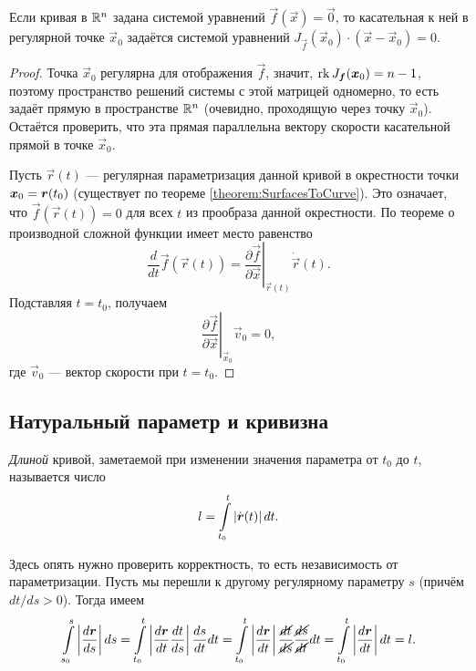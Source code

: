 \begin{proposition}
	Если кривая в $\mathbb{R}^n$ задана системой уравнений $\vec{f}(\vec{x}) = \vec{0}$, то касательная к ней в регулярной точке $\vec{x}_0$ задаётся системой уравнений $J_{\vec{f}}(\vec{x}_0) \cdot (\vec{x} - \vec{x}_0) = 0$.
\end{proposition}

\begin{proof}
	Точка $\vec{x}_0$ регулярна для отображения $\vec{f}$, значит, $\operatorname{rk} J_{\boldsymbol{f}}(\boldsymbol{x}_0) = n - 1$, поэтому пространство решений системы с этой матрицей одномерно, то есть задаёт прямую в пространстве $\mathbb{R}^n$ (очевидно, проходящую через точку $\vec{x}_0$). Остаётся проверить, что эта прямая параллельна вектору скорости касательной прямой в точке $\vec{x}_0$.

	Пусть $\vec{r}(t)$ --- регулярная параметризация данной кривой в окрестности точки $\vec{x}_0 \hm= \vec{r}(t_0)$ (существует по теореме \ref{theorem:SurfacesToCurve}). Это означает, что $\vec{f}(\vec{r}(t)) = 0$ для всех $t$ из прообраза данной окрестности. По теореме о производной сложной функции имеет место равенство
	\[
		\frac{d}{dt}\vec{f}(\vec{r}(t)) = \left.\frac{\partial\vec{f}}{\partial\vec{x}}\right|_{\vec{r}(t)}\dot{\vec{r}}(t).
	\]
	Подставляя $t = t_0$, получаем
	\[
		\left.\frac{\partial\vec{f}}{\partial\vec{x}}\right|_{\vec{x}_0}\vec{v}_0 = 0,
	\]
	где $\vec{v}_0$ --- вектор скорости при $t = t_0$.
\end{proof}

\subsection{Натуральный параметр и кривизна}

\begin{definition}
	\textit{Длиной} кривой, заметаемой при изменении значения параметра от $t_0$ до $t$, называется число
	\[
		l = \int\limits_{t_0}^t\left\lvert\dot{\boldsymbol{r}}(t)\right\rvert dt.
	\]
\end{definition}

Здесь опять нужно проверить корректность, то есть независимость от параметризации. Пусть мы перешли к другому регулярному параметру $s$ (причём $dt / ds > 0$). Тогда имеем
\[
	\int\limits_{s_0}^s\left\lvert\frac{d\boldsymbol{r}}{ds}\right\rvert ds = \int\limits_{t_0}^t\left\lvert\frac{d\boldsymbol{r}}{dt}\frac{dt}{ds}\right\rvert\frac{ds}{dt}dt = \int\limits_{t_0}^t\left\lvert\frac{d\boldsymbol{r}}{dt}\right\rvert\frac{\cancel{dt}}{\cancel{ds}}\frac{\cancel{ds}}{\cancel{dt}}dt = \int\limits_{t_0}^t\left\lvert\frac{d\boldsymbol{r}}{dt}\right\rvert dt = l.
\]

